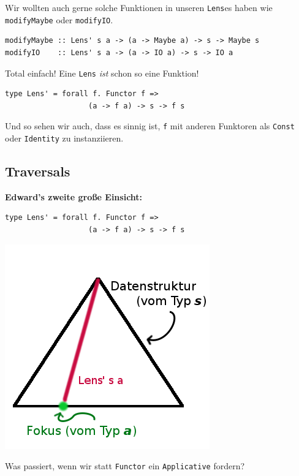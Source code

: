 \documentclass{beamer}
\begin{document}
\begin{frame}[fragile]
Wir wollten auch gerne solche Funktionen in unseren \texttt{Lens}es haben wie \texttt{modifyMaybe} oder \texttt{modifyIO}.

\begin{verbatim}
modifyMaybe :: Lens' s a -> (a -> Maybe a) -> s -> Maybe s
modifyIO    :: Lens' s a -> (a -> IO a) -> s -> IO a
\end{verbatim}
\pause

Total einfach! Eine \texttt{Lens} \emph{ist} schon so eine Funktion!

\begin{verbatim}
type Lens' = forall f. Functor f =>
                   (a -> f a) -> s -> f s
\end{verbatim}

Und so sehen wir auch, dass es sinnig ist, \texttt{f} mit anderen Funktoren als \texttt{Const}
oder \texttt{Identity} zu instanziieren.

\end{frame}

\subsection{Traversals}

\begin{frame}[fragile]
\textbf{Edward's zweite große Einsicht:}\pause\bigskip

\begin{verbatim}
type Lens' = forall f. Functor f =>
                   (a -> f a) -> s -> f s
\end{verbatim}

\begin{center}
\includegraphics[scale=0.4]{lens_3.png} 
\end{center}
\pause

Was passiert, wenn wir statt \texttt{Functor} ein \texttt{Applicative} fordern?

\end{frame}
\end{document}
